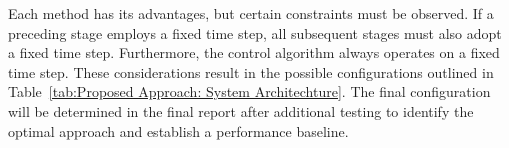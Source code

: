 Each method has its advantages, but certain constraints must be observed. If a preceding stage employs a fixed time step, all subsequent stages must also adopt a fixed time step. Furthermore, the control algorithm always operates on a fixed time step. These considerations result in the possible configurations outlined in Table~\ref{tab:Proposed Approach: System Architechture}. The final configuration will be determined in the final report after additional testing to identify the optimal approach and establish a performance baseline.

\begin{table}[H]
    \centering
    \caption{Possible feedback architectures for the proposed system.}
    \label{tab:Proposed Approach: System Architechture}
\end{table}
